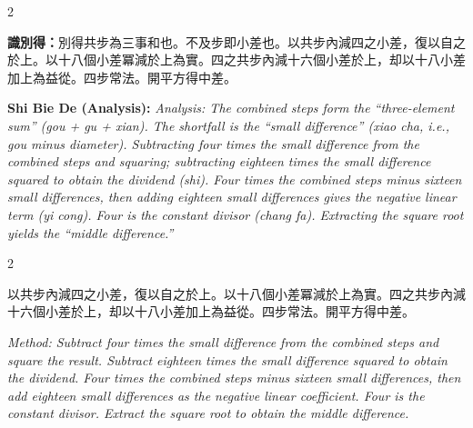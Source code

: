\documentclass[11pt,a4paper]{article}
\newcommand{\fayueC}[1]{\par\noindent{\color{methodcolor}\textbf{法曰：}}#1\par}
\newcommand{\zhiC}[1]{\par\noindent\textbf{識別得：}#1\par}
\newcommand{\fayueE}[1]{\par\noindent{\color{methodcolor}\textbf{Fa Yue (Method): }}\textit{#1}\par}
\newcommand{\zhiE}[1]{\par\noindent\textbf{Shi Bie De (Analysis): }\textit{#1}\par}
\begin{document}
\begin{paracol}{2}
\zhiC{別得共步為三事和也。不及步即小差也。以共步內減四之小差，復以自之於上。以十八個小差冪減於上為實。四之共步內減十六個小差於上，却以十八小差加上為益從。四步常法。開平方得中差。}
\switchcolumn
\zhiE{Analysis: The combined steps form the ``three-element sum'' (gou + gu + xian). The shortfall is the ``small difference'' (xiao cha, i.e., gou minus diameter). Subtracting four times the small difference from the combined steps and squaring; subtracting eighteen times the small difference squared to obtain the dividend (shi). Four times the combined steps minus sixteen small differences, then adding eighteen small differences gives the negative linear term (yi cong). Four is the constant divisor (chang fa). Extracting the square root yields the ``middle difference.''}
\end{paracol}

\vspace{0.2cm}

\begin{paracol}{2}
\fayueC{以共步內減四之小差，復以自之於上。以十八個小差冪減於上為實。四之共步內減十六個小差於上，却以十八小差加上為益從。四步常法。開平方得中差。}
\switchcolumn
\fayueE{Method: Subtract four times the small difference from the combined steps and square the result. Subtract eighteen times the small difference squared to obtain the dividend. Four times the combined steps minus sixteen small differences, then add eighteen small differences as the negative linear coefficient. Four is the constant divisor. Extract the square root to obtain the middle difference.}
\end{paracol}

\vspace{0.2cm}
\end{document}
